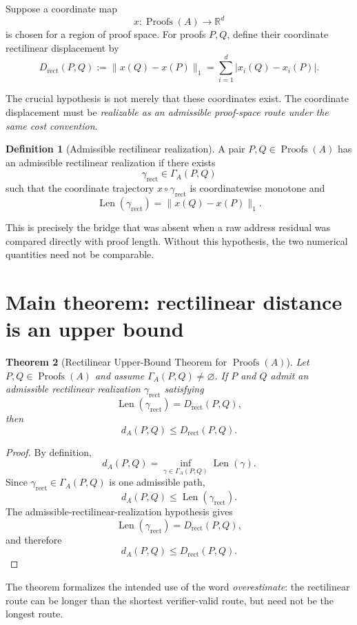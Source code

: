 \documentclass[11pt]{article}
\newtheorem{theorem}{Theorem}[section]
\theoremstyle{definition}
\newtheorem{definition}[theorem]{Definition}
\newcommand{\Proofs}{\operatorname{Proofs}}
\newcommand{\Drect}{D_{\mathrm{rect}}}
\newcommand{\len}{\operatorname{Len}}
\newcommand{\distA}{d_A}
\newcommand{\R}{\mathbb{R}}
\begin{document}
Suppose a coordinate map
\[
x:\Proofs(A)\longrightarrow \R^d
\]
is chosen for a region of proof space.  For proofs $P,Q$, define their coordinate rectilinear displacement by
\[
\boxed{
\Drect(P,Q)
:=
\|x(Q)-x(P)\|_1
=
\sum_{i=1}^d |x_i(Q)-x_i(P)|.
}
\]

The crucial hypothesis is not merely that these coordinates exist.  The coordinate displacement must be \emph{realizable as an admissible proof-space route under the same cost convention}.

\begin{definition}[Admissible rectilinear realization]
A pair $P,Q\in\Proofs(A)$ has an admissible rectilinear realization if there exists
\[
\gamma_{\mathrm{rect}}\in\Gamma_A(P,Q)
\]
such that the coordinate trajectory $x\circ\gamma_{\mathrm{rect}}$ is coordinatewise monotone and
\[
\len(\gamma_{\mathrm{rect}})
=
\|x(Q)-x(P)\|_1.
\]
\end{definition}

This is precisely the bridge that was absent when a raw address residual was compared directly with proof length.  Without this hypothesis, the two numerical quantities need not be comparable.

\section{Main theorem: rectilinear distance is an upper bound}

\begin{theorem}[Rectilinear Upper-Bound Theorem for $\Proofs(A)$]\label{thm:upper}
Let $P,Q\in\Proofs(A)$ and assume $\Gamma_A(P,Q)\neq\varnothing$.  If $P$ and $Q$ admit an admissible rectilinear realization $\gamma_{\mathrm{rect}}$ satisfying
\[
\len(\gamma_{\mathrm{rect}})=\Drect(P,Q),
\]
then
\[
\boxed{
\distA(P,Q)\le \Drect(P,Q).
}
\]
\end{theorem}

\begin{proof}
By definition,
\[
\distA(P,Q)
=
\inf_{\gamma\in\Gamma_A(P,Q)}\len(\gamma).
\]
Since $\gamma_{\mathrm{rect}}\in\Gamma_A(P,Q)$ is one admissible path,
\[
\distA(P,Q)
\le
\len(\gamma_{\mathrm{rect}}).
\]
The admissible-rectilinear-realization hypothesis gives
\[
\len(\gamma_{\mathrm{rect}})=\Drect(P,Q),
\]
and therefore
\[
\distA(P,Q)\le\Drect(P,Q).
\]
\end{proof}

The theorem formalizes the intended use of the word \emph{overestimate}: the rectilinear route can be longer than the shortest verifier-valid route, but need not be the longest route.
\end{document}
